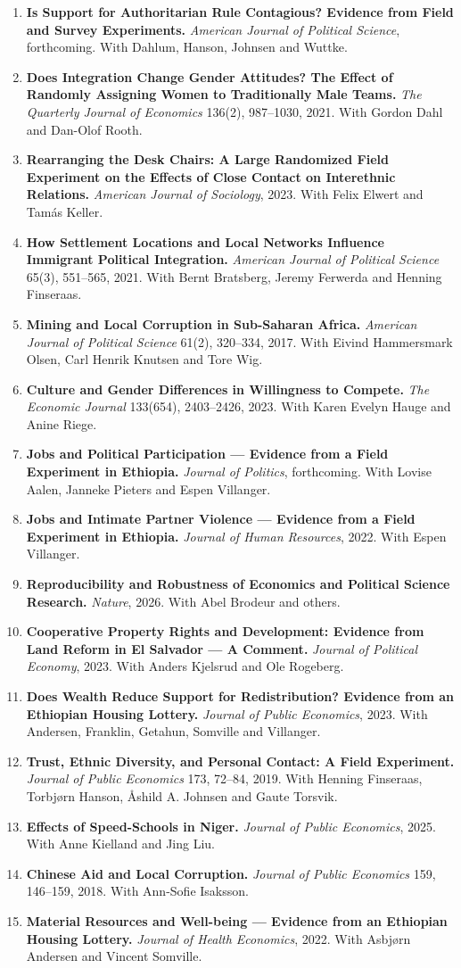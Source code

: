 \documentclass[11pt]{article}
\newcommand{\pub}[2]{\item \textbf{#1} #2}
\begin{document}
\begin{enumerate}
\pub{Is Support for Authoritarian Rule Contagious? Evidence from Field and Survey Experiments.}{\textit{American Journal of Political Science}, forthcoming. With Dahlum, Hanson, Johnsen and Wuttke.}
\pub{Does Integration Change Gender Attitudes? The Effect of Randomly Assigning Women to Traditionally Male Teams.}{\textit{The Quarterly Journal of Economics} 136(2), 987--1030, 2021. With Gordon Dahl and Dan-Olof Rooth.}
\pub{Rearranging the Desk Chairs: A Large Randomized Field Experiment on the Effects of Close Contact on Interethnic Relations.}{\textit{American Journal of Sociology}, 2023. With Felix Elwert and Tamás Keller.}
\pub{How Settlement Locations and Local Networks Influence Immigrant Political Integration.}{\textit{American Journal of Political Science} 65(3), 551--565, 2021. With Bernt Bratsberg, Jeremy Ferwerda and Henning Finseraas.}
\pub{Mining and Local Corruption in Sub-Saharan Africa.}{\textit{American Journal of Political Science} 61(2), 320--334, 2017. With Eivind Hammersmark Olsen, Carl Henrik Knutsen and Tore Wig.}
\pub{Culture and Gender Differences in Willingness to Compete.}{\textit{The Economic Journal} 133(654), 2403--2426, 2023. With Karen Evelyn Hauge and Anine Riege.}
\pub{Jobs and Political Participation --- Evidence from a Field Experiment in Ethiopia.}{\textit{Journal of Politics}, forthcoming. With Lovise Aalen, Janneke Pieters and Espen Villanger.}
\pub{Jobs and Intimate Partner Violence --- Evidence from a Field Experiment in Ethiopia.}{\textit{Journal of Human Resources}, 2022. With Espen Villanger.}
\pub{Reproducibility and Robustness of Economics and Political Science Research.}{\textit{Nature}, 2026. With Abel Brodeur and others.}
\pub{Cooperative Property Rights and Development: Evidence from Land Reform in El Salvador --- A Comment.}{\textit{Journal of Political Economy}, 2023. With Anders Kjelsrud and Ole Rogeberg.}
\pub{Does Wealth Reduce Support for Redistribution? Evidence from an Ethiopian Housing Lottery.}{\textit{Journal of Public Economics}, 2023. With Andersen, Franklin, Getahun, Somville and Villanger.}
\pub{Trust, Ethnic Diversity, and Personal Contact: A Field Experiment.}{\textit{Journal of Public Economics} 173, 72--84, 2019. With Henning Finseraas, Torbjørn Hanson, Åshild A. Johnsen and Gaute Torsvik.}
\pub{Effects of Speed-Schools in Niger.}{\textit{Journal of Public Economics}, 2025. With Anne Kielland and Jing Liu.}
\pub{Chinese Aid and Local Corruption.}{\textit{Journal of Public Economics} 159, 146--159, 2018. With Ann-Sofie Isaksson.}
\pub{Material Resources and Well-being --- Evidence from an Ethiopian Housing Lottery.}{\textit{Journal of Health Economics}, 2022. With Asbjørn Andersen and Vincent Somville.}

\end{enumerate}
\end{document}
